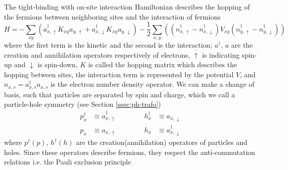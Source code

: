 The tight-binding with on-site interaction Hamiltonian describes the hopping of the fermions between neighboring sites and the interaction of fermions
\begin{equation}
    H = - \sum_{xy} \left( a^\dagger_{x,\uparrow} K_{xy} a_{y,\uparrow} + a^\dagger_{x,\downarrow} K_{xy} a_{y,\downarrow} \right) - \frac{1}{2} \sum_{x,y} \left( (n^\dagger_{x,\uparrow} - n^\dagger_{x,\downarrow}) V_{xy} (n^\dagger_{y,\uparrow} - n^\dagger_{y,\downarrow}) \right)
\end{equation}
where the first term is the kinetic and the second is the interaction; $a^\dagger$, $a$ are the creation and annihilation operators respectively of electrons, $\uparrow$ is indicating spin-up and $\downarrow$ is spin-down, $K$ is called the hopping matrix which describes the hopping between sites, the interaction term is represented by the potential $V$, and $n_{x,s} = a^\dagger_{x,s} a_{x,s}$ is the electron number density operator. We can make a change of basis, such that particles are separated by spin and charge, which we call a particle-hole symmetry (see Section \ref{ssec:ph-trafo})
\begin{equation}
    \begin{aligned}
        p^\dagger_x & \equiv a^\dagger_{x,\uparrow} \qquad\qquad h^\dagger_x & \equiv a_{x,\downarrow} \\
        p_x & \equiv a_{x,\uparrow} \qquad\qquad h_x & \equiv a^\dagger_{x,\downarrow}
    \end{aligned}
    \label{eq:ph-switch}
\end{equation}
where $p^\dagger (p)$, $h^\dagger (h)$ are the creation(annihilation) operators of particles and holes. Since these operators describe fermions, they respect the anti-commutation relations i.e. the Pauli exclusion principle

